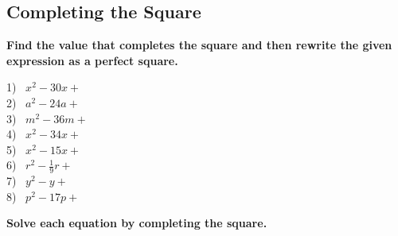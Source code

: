 \documentclass[12pt]{book}
\theoremstyle{definition}
\begin{document}
\subsection*{Completing the Square}

{\bf Find the value that completes the square and then rewrite the given expression as a
perfect square.}

\begin{multicols}{3}
  1)~ $x^2 - 30 x +$~\underline{\hspace{.5in}}\\
  2)~ $a^2 - 24 a +$~\underline{\hspace{.5in}}\\
  3)~ $m^2 - 36 m +$~\underline{\hspace{.5in}}\\
  4)~ $x^2 - 34 x +$~\underline{\hspace{.5in}}\\
  5)~ $x^2 - 15 x +$~\underline{\hspace{.5in}}\\
  6)~ $r^2 - \frac{1}{9} r +$~\underline{\hspace{.5in}}\\
  7)~ $y^2 - y +$~\underline{\hspace{.5in}}\\
  8)~ $p^2 - 17 p +$~\underline{\hspace{.5in}}
\end{multicols}

{\bf Solve each equation by completing the square.}
\end{document}
